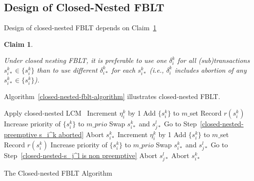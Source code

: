 \documentclass[letter]{sig-alternate}
\newtheorem{clm}{Claim}
\begin{document}
\subsection{Design of Closed-Nested FBLT}

Design of closed-nested FBLT depends on Claim~\ref{closed_nesting_fblt_one_delta}
%
\begin{clm}\label{closed_nesting_fblt_one_delta}

Under closed nesting FBLT, it is preferable to use one $\delta_{i}^{k}$
for all (sub)transactions $s_{i*}^{k}\in\{s_{i}^{k}\}$ than to use
different $\delta_{i*}^{k}$ for each $s_{i*}^{k}$ (i.e., $\delta_{i}^{k}$
includes abortion of any $s_{i*}^{k}\in\{s_{i}^{k}\}$).

\end{clm}
%
Algorithm~\ref{closed-nested-fblt-algorithm} illustrates closed-nested FBLT. 
%
\begin{algorithm}[!htpd]
\footnotesize{
\LinesNumbered
{}
{
%
Apply closed-nested LCM~\cite{lcmdac2012}\label{apply closed-nested-lcm}\;
%
{
{
Increment $\eta_i^k$ by 1\label{closed-nested-increment eta 1}\;
}
{
Add $\{s_i^k\}$ to $m\_$set\label{closed-nested-add to m_set 1}\;
Record $r(s_i^k)$\label{closed-nested-record 1}\;
Increase priority of $\{s_i^k\}$ to $m\_prio$\label{closed-nested-increase priority 1}\;
}
}
{
Swap $s_{i*}^k$ and $s_{j*}^l$\;
Go to Step~\ref{closed-nested-preemptive s_i^k aborted}\;
}
}
{
Abort $s_{i*}^k$\;
{
Increment $\eta_i^k$ by 1\label{closed-nested-increment eta 2}\;
}
{
Add $\{s_i^k\}$ to $m\_$set\label{closed-nested-add to m_set 2}\;
Record $r(s_i^k)$\label{closed-nested-record 2}\;
Increase priority of $\{s_i^k\}$ to $m\_prio$\label{closed-nested-increase priority 2}\;
}
}
{
Swap $s_{i*}^k$ and $s_{j*}^l$\;
Go to Step~\ref{closed-nested-s_j^l is non preemptive}\label{closed-nested-end preemptive and non preemptive}\;
}
\Else
{
\label{closed-nested-both non preemptive}
{	
Abort $s_{j*}^l$\label{closed-nested-s_i^k first in m_set}\;
}
{
Abort $s_{i*}^k$\label{closed-nested-s_j^l first in m_set}\;
}
}
}
\caption{The Closed-nested FBLT Algorithm}\label{closed-nested-fblt-algorithm}
\end{algorithm}
\end{document}
